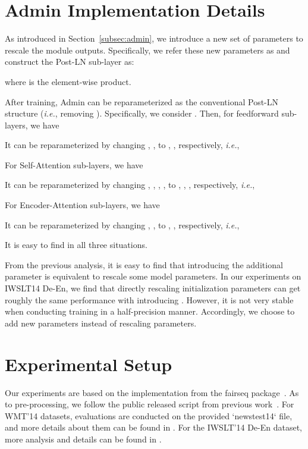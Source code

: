 \documentclass[11pt,a4paper]{article}
\newcommand{\our}{\mbox{Admin}\xspace}
\newcommand{\ie}{\textit{i.e.}}
\begin{document}
\section{\our Implementation Details}
\label{appendix:implement}

As introduced in Section~\ref{subsec:admin}, we introduce a new set of parameters to rescale the module outputs. 
Specifically, we refer these new parameters as  and construct the Post-LN sub-layer as:

where  is the element-wise product. 

After training, \our can be reparameterized as the conventional Post-LN structure (\ie, removing ). 
Specifically, we consider . 
Then, for feedforward sub-layers, we have

It can be reparameterized by changing , ,  to , ,  respectively, \ie, 

For Self-Attention sub-layers, we have 
 
It can be reparameterized by changing , , , ,  to , , ,   respectively, \ie, 

For Encoder-Attention sub-layers, we have 
 
It can be reparameterized by changing , ,  to , ,  respectively, \ie, 

It is easy to find  in all three situations. 

From the previous analysis, it is easy to find that introducing the additional parameter  is equivalent to rescale some model parameters. 
In our experiments on IWSLT14 De-En, we find that directly rescaling initialization parameters can get roughly the same performance with introducing . 
However, it is not very stable when conducting training in a half-precision manner. 
Accordingly, we choose to add new parameters  instead of rescaling parameters. 

\section{Experimental Setup}
\label{appendix:exp}

Our experiments are based on the implementation from the fairseq package~\citep{ott2019fairseq}.
As to pre-processing, we follow the public released script from previous work~\citep{ott2019fairseq,lu2020understanding}. 
For WMT'14 datasets, evaluations are conducted on the provided `newstest14` file, and more details about them can be found in \citet{bojar2014findings}. 
For the IWSLT'14 De-En dataset, more analysis and details can be found in \citet{cettolo2014report}. 
\end{document}

